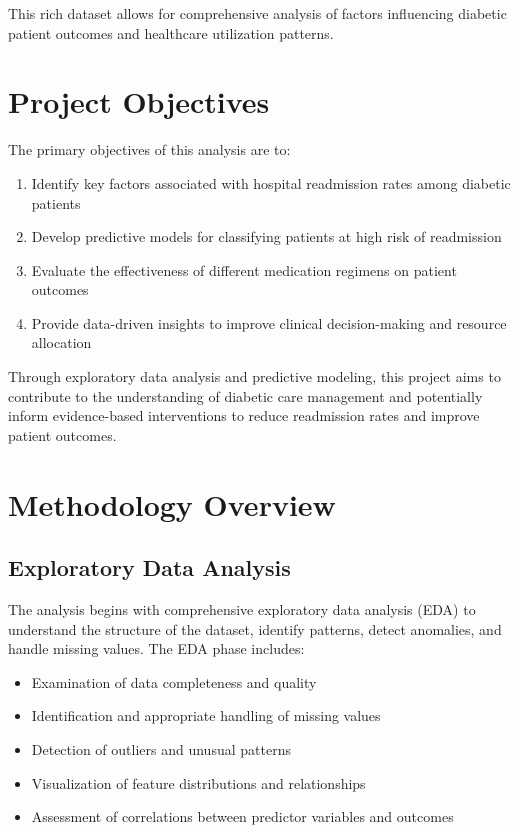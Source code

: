 This rich dataset allows for comprehensive analysis of factors influencing diabetic patient outcomes and healthcare utilization patterns.

\section{Project Objectives}
The primary objectives of this analysis are to:

\begin{enumerate}
    \item Identify key factors associated with hospital readmission rates among diabetic patients
    \item Develop predictive models for classifying patients at high risk of readmission
    \item Evaluate the effectiveness of different medication regimens on patient outcomes
    \item Provide data-driven insights to improve clinical decision-making and resource allocation
\end{enumerate}

Through exploratory data analysis and predictive modeling, this project aims to contribute to the understanding of diabetic care management and potentially inform evidence-based interventions to reduce readmission rates and improve patient outcomes.

\section{Methodology Overview}

\subsection{Exploratory Data Analysis}
The analysis begins with comprehensive exploratory data analysis (EDA) to understand the structure of the dataset, identify patterns, detect anomalies, and handle missing values. The EDA phase includes:

\begin{itemize}
    \item Examination of data completeness and quality
    \item Identification and appropriate handling of missing values
    \item Detection of outliers and unusual patterns
    \item Visualization of feature distributions and relationships
    \item Assessment of correlations between predictor variables and outcomes
\end{itemize}

